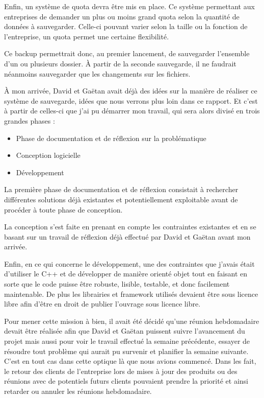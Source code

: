 \documentclass[a4paper,10pt, twoside]{report}
\begin{document}
\begin{spacing}{1.2}
Enfin, un syst\`eme de quota devra \^etre mis en place. Ce syst\`eme permettant
aux entreprises de demander un plus ou moins grand quota selon la quantit\'e de
donn\'ees \`a sauvegarder. Celle-ci pouvant varier selon la taille ou la
fonction de l'entreprise, un quota permet une certaine flexibilit\'e.

Ce backup permettrait donc, au premier lancement, de sauvegarder l'ensemble
d'un ou plusieurs dossier. \`A partir de la seconde sauvegarde, il ne faudrait
n\'eanmoins sauvegarder que les changements sur les fichiers.

\`A mon arriv\'ee, David et Ga\"etan avait d\'ej\`a des id\'ees sur la
mani\`ere de r\'ealiser ce syst\`eme de sauvegarde, id\'ees que nous verrons
plus loin dans ce rapport. Et c'est \`a partir de celles-ci que j'ai pu
d\'emarrer mon travail, qui sera alors divis\'e en trois grandes phases :

\begin{itemize}
 \item Phase de documentation et de r\'eflexion sur la probl\'ematique
 \item Conception logicielle
 \item D\'eveloppement
\end{itemize}

La premi\`ere phase de documentation et de r\'eflexion consistait \`a
rechercher diff\'erentes solutions d\'ej\`a existantes et potentiellement
exploitable avant de proc\'eder \`a toute phase de conception.

La conception s'est faite en prenant en compte les contraintes existantes
et en se basant sur un travail de r\'eflexion d\'ej\`a effectu\'e par David et
Ga\"etan avant mon arriv\'ee.

Enfin, en ce qui concerne le d\'eveloppement, une des contraintes que j'avais
\'etait d'utiliser le C++ et de d\'evelopper de mani\`ere orient\'e objet tout
en faisant en sorte que le code puisse \^etre robuste, lisible, testable, et
donc facilement maintenable. De plus les librairies et framework utilis\'es
devaient \^etre sous licence libre afin d'\^etre en droit de publier l'ouvrage
sous licence libre.

Pour mener cette mission \`a bien, il avait \'et\'e d\'ecid\'e qu'une r\'eunion
hebdomadaire devait \^etre r\'ealis\'ee afin que David et Ga\"etan puissent
suivre l'avancement du projet mais aussi pour voir le travail effectu\'e la
semaine pr\'ec\'edente, essayer de r\'esoudre tout probl\`eme qui aurait pu
survenir et planifier la semaine suivante.
C'est en tout cas dans cette optique l\`a que nous avions commenc\'e. Dans les
fait, le retour des clients de l'entreprise lors de mises \`a jour des produits
ou des r\'eunions avec de potentiels futurs clients pouvaient prendre la
priorit\'e et ainsi retarder ou annuler les r\'eunions hebdomadaire.


\end{spacing}
\end{document}
